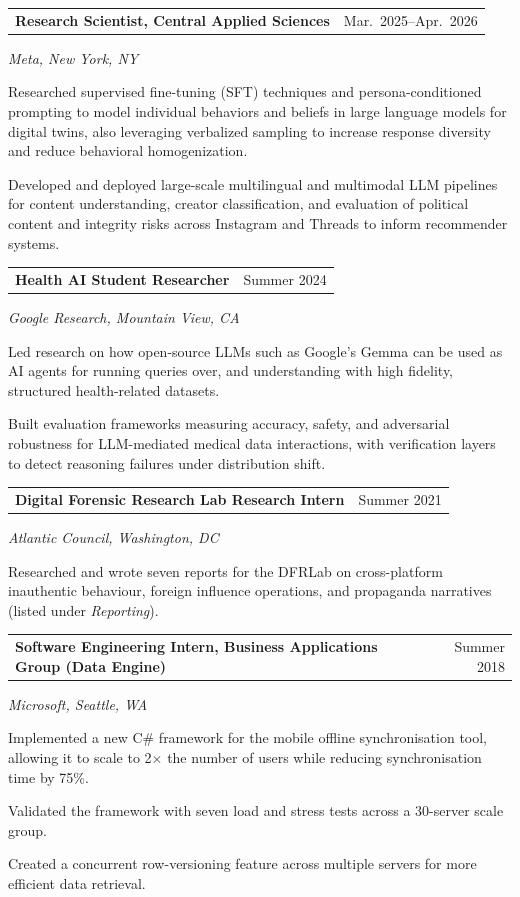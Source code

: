 \documentclass[11pt,letterpaper]{article}
\makeatletter
\newcommand{\entry}[2]{%
  \noindent\begin{tabularx}{\textwidth}{@{}X r@{}}
    #1 & {\small\color{inksoft}#2}
  \end{tabularx}\par
}
\newcommand{\role}[3]{%
  \entry{\textbf{#1}}{#3}%
  {\small\itshape\color{inksoft}#2}\par\vspace{0.15em}
}
\makeatother
\begin{document}
\vspace{0.45em}
\role{Research Scientist, Central Applied Sciences}{Meta, New York, NY}{Mar.\ 2025--Apr.\ 2026}
\begin{bullets}
  \item Researched supervised fine-tuning (SFT) techniques and persona-conditioned prompting to model individual behaviors and beliefs in large language models for digital twins, also leveraging verbalized sampling to increase response diversity and reduce behavioral homogenization.
  \item Developed and deployed large-scale multilingual and multimodal LLM pipelines for content understanding, creator classification, and evaluation of political content and integrity risks across Instagram and Threads to inform recommender systems.
\end{bullets}

\vspace{0.45em}
\role{Health AI Student Researcher}{Google Research, Mountain View, CA}{Summer 2024}
\begin{bullets}
  \item Led research on how open-source LLMs such as Google's Gemma can be used as AI agents for running queries over, and understanding with high fidelity, structured health-related datasets.
  \item Built evaluation frameworks measuring accuracy, safety, and adversarial robustness for LLM-mediated medical data interactions, with verification layers to detect reasoning failures under distribution shift.
\end{bullets}

\vspace{0.45em}
\role{Digital Forensic Research Lab Research Intern}{Atlantic Council, Washington, DC}{Summer 2021}
\begin{bullets}
  \item Researched and wrote seven reports for the DFRLab on cross-platform inauthentic behaviour, foreign influence operations, and propaganda narratives (listed under \textit{Reporting}).
\end{bullets}

\vspace{0.45em}
\role{Software Engineering Intern, Business Applications Group (Data Engine)}{Microsoft, Seattle, WA}{Summer 2018}
\begin{bullets}
  \item Implemented a new C\# framework for the mobile offline synchronisation tool, allowing it to scale to 2$\times$ the number of users while reducing synchronisation time by 75\%.
  \item Validated the framework with seven load and stress tests across a 30-server scale group.
  \item Created a concurrent row-versioning feature across multiple servers for more efficient data retrieval.
\end{bullets}
\end{document}
